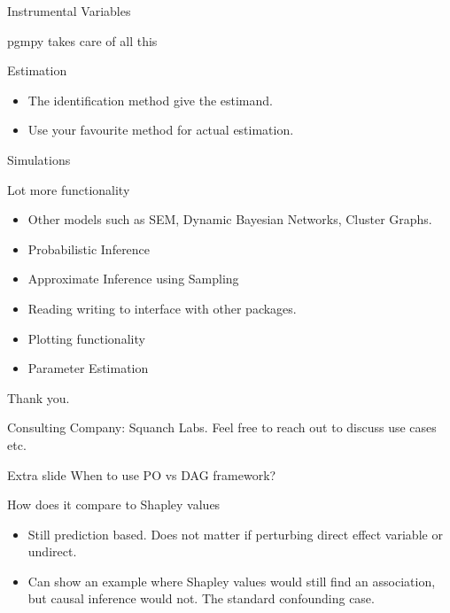 \documentclass{beamer}
\begin{document}
\begin{frame}{Instrumental Variables}
\end{frame}

\begin{frame}{pgmpy takes care of all this}
\end{frame}

\begin{frame}{Estimation}
	\begin{itemize}
		\item The identification method give the estimand.
		\item Use your favourite method for actual estimation.
	\end{itemize}
\end{frame}

\begin{frame}{Simulations}
\end{frame}

\begin{frame}{Lot more functionality}
	\begin{itemize}
		\item Other models such as SEM, Dynamic Bayesian Networks, Cluster Graphs.
		\item Probabilistic Inference
		\item Approximate Inference using Sampling
		\item Reading writing to interface with other packages.
		\item Plotting functionality
		\item Parameter Estimation
	\end{itemize}
\end{frame}

\begin{frame}
	Thank you.

	Consulting Company: Squanch Labs. Feel free to reach out to discuss use cases etc.
\end{frame}

\begin{frame}{Extra slide}
	When to use PO vs DAG framework?
\end{frame}

\begin{frame}
	How does it compare to Shapley values 
	\begin{itemize}
		\item Still prediction based. Does not matter if perturbing direct effect variable or undirect.
		\item Can show an example where Shapley values would still find an association, but causal inference would not. The standard confounding case.
	\end{itemize}
\end{frame}
\end{document}
